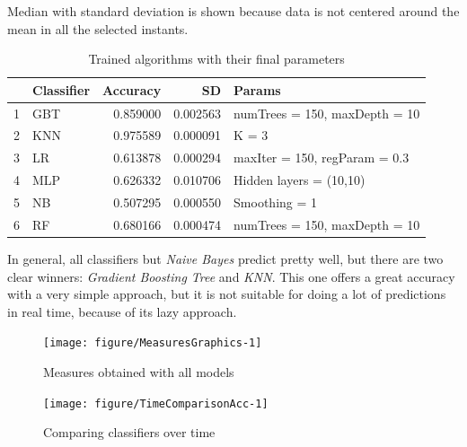 \documentclass[a4paper,twoside]{article}\usepackage[]{graphicx}\usepackage[]{color}
\newenvironment{knitrout}{}{} %
\begin{document}
Median with standard deviation is shown because data is not centered around the
mean in all the selected instants.

\begin{table}[ht]
\centering
\begin{tabular}{rlrrl}
  \hline
 & Classifier & Accuracy & SD & Params \\ 
  \hline
1 & GBT & 0.859000 & 0.002563 & numTrees = 150, maxDepth = 10 \\ 
  2 & KNN & 0.975589 & 0.000091 & K = 3 \\ 
  3 & LR & 0.613878 & 0.000294 & maxIter = 150, regParam = 0.3 \\ 
  4 & MLP & 0.626332 & 0.010706 & Hidden layers = (10,10) \\ 
  5 & NB & 0.507295 & 0.000550 & Smoothing = 1 \\ 
  6 & RF & 0.680166 & 0.000474 & numTrees = 150, maxDepth = 10 \\ 
   \hline
\end{tabular}
\caption{Trained algorithms with their final parameters} 
\label{tab:measures}
\end{table}


In general, all classifiers but \emph{Naive Bayes} predict pretty well, but
there are two clear winners: \emph{Gradient Boosting Tree} and \emph{KNN}.
This one offers a great accuracy with a very simple approach, but it is not
suitable for doing a lot of predictions in real time, because of its lazy
approach.

\color{fgcolor}
\begin{figure}[h!tb]
\texttt{[image: figure/MeasuresGraphics-1]} \caption[Measures obtained with all models]{Measures obtained with all models}\label{fig:MeasuresGraphics}
\end{figure}



\color{fgcolor}
\begin{figure}[h!tb]
\texttt{[image: figure/TimeComparisonAcc-1]} \caption[Comparing classifiers over time]{Comparing classifiers over time}\label{fig:TimeComparisonAcc}
\end{figure}
\end{document}
